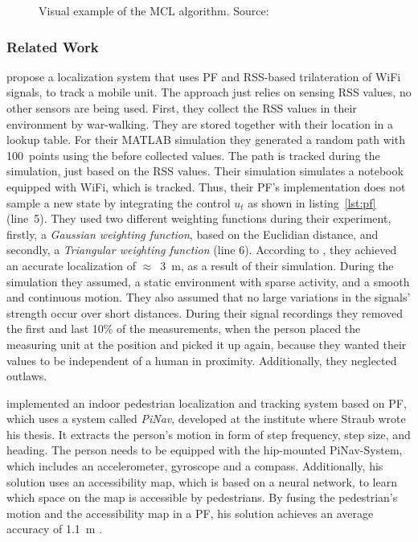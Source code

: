


\begin{figure}[width=0.9\textwidth, height=0.4\textheight]
	
	\caption{Visual example of the \acs{MCL} algorithm. Source:~\citep{thrun:prob_robo}}
	\label{fig:mcl}
\end{figure}


\subsubsection*{Related Work}

\citet{Siddiqui:tracking} propose a localization system that uses \acs{PF} and \acs{RSS}-based trilateration of WiFi signals, to track a mobile unit. The approach just relies on sensing \acs{RSS} values, no other sensors are being used. First, they collect the \acs{RSS} values in their environment by war-walking. They are stored together with their location in a lookup table. For their MATLAB simulation they generated a random path with 100~points using the before collected values. The path is tracked during the simulation, just based on the \acs{RSS} values. Their simulation simulates a notebook equipped with WiFi, which is tracked. Thus, their \acs{PF}'s implementation does not sample a new state by integrating the control $u_t$ as shown in listing~\ref{lst:pf} (line~5). They used two different weighting functions during their experiment, firstly, a \emph{Gaussian weighting function}, based on the Euclidian distance, and secondly, a \emph{Triangular weighting function} (line 6). According to \citet{Siddiqui:tracking}, they achieved an accurate localization of $\approx$~3~m, as a result of their simulation. During the simulation they assumed, a static environment with sparse activity, and a smooth and continuous motion. They also assumed that no large variations in the signals' strength occur over short distances. During their signal recordings they removed the first and last 10\% of the measurements, when the person placed the measuring unit at the position and picked it up again, because they wanted their values to be independent of a human in proximity. Additionally, they neglected outlaws.

\citet{straub:pf} implemented an indoor pedestrian localization and tracking system based on \acs{PF}, which uses a system called \emph{PiNav}, developed at the institute where Straub wrote his thesis. It extracts the person's motion in form of step frequency, step size, and heading. The person needs to be equipped with the hip-mounted PiNav-System, which includes an accelerometer, gyroscope and a compass. Additionally, his solution uses an accessibility map, which is based on a neural network, to learn which space on the map is accessible by pedestrians. By fusing the pedestrian's motion and the accessibility map in a \acs{PF}, his solution achieves an average accuracy of 1.1~m \citep{straub:pf}.

